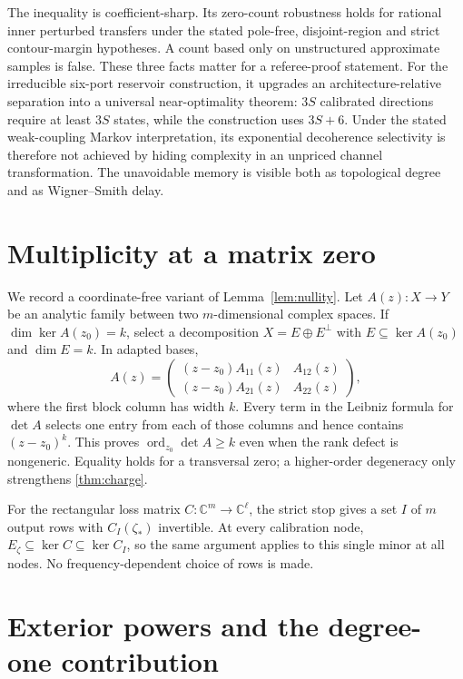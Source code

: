 \documentclass[11pt]{article}
\theoremstyle{definition}
\theoremstyle{remark}
\newcommand{\C}{\mathbb{C}}
\newcommand{\ord}{\operatorname{ord}}
\begin{document}
The inequality is coefficient-sharp. Its zero-count robustness holds for
rational inner perturbed transfers under the stated pole-free, disjoint-region
and strict contour-margin hypotheses. A count based only on unstructured
approximate samples is false. These three
facts matter for a referee-proof statement.  For the irreducible six-port
reservoir construction, it upgrades an architecture-relative separation into
a universal near-optimality theorem: $3S$ calibrated directions require at
least $3S$ states, while the construction uses $3S+6$.  Under the stated weak-coupling Markov interpretation, its exponential
decoherence selectivity is therefore not achieved by hiding complexity in an
unpriced channel transformation.  The unavoidable memory is visible both as
topological degree and as Wigner--Smith delay.

\appendix

\section{Multiplicity at a matrix zero}

We record a coordinate-free variant of Lemma~\ref{lem:nullity}.  Let
$A(z):X\to Y$ be an analytic family between two $m$-dimensional complex
spaces.  If $\dim\ker A(z_0)=k$, select a decomposition
$X=E\oplus E^\perp$ with $E\subseteq\ker A(z_0)$ and $\dim E=k$.  In adapted
bases,
\[
 A(z)=\begin{pmatrix}
  (z-z_0)A_{11}(z)&A_{12}(z)\\
  (z-z_0)A_{21}(z)&A_{22}(z)
 \end{pmatrix},
\]
where the first block column has width $k$.  Every term in the Leibniz
formula for $\det A$ selects one entry from each of those columns and hence
contains $(z-z_0)^k$.  This proves
$\ord_{z_0}\det A\geq k$ even when the rank defect is nongeneric.  Equality
holds for a transversal zero; a higher-order degeneracy only strengthens
\cref{thm:charge}.

For the rectangular loss matrix $C:\C^m\to\C^\ell$, the strict stop gives a
set $I$ of $m$ output rows with $C_I(\zeta_*)$ invertible.  At every
calibration node, $E_\zeta\subseteq\ker C\subseteq\ker C_I$, so the same
argument applies to this single minor at all nodes.  No frequency-dependent
choice of rows is made.

\section{Exterior powers and the degree-one contribution}
\end{document}
